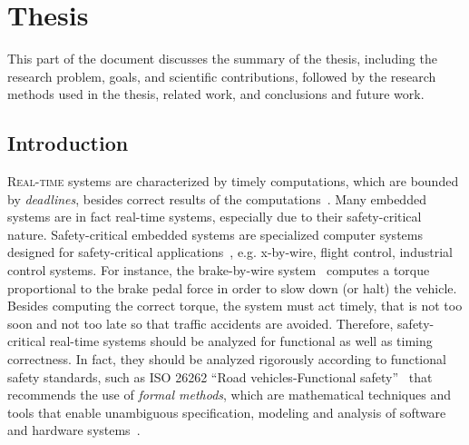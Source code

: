 \part{Thesis}%
This part of the document discusses the summary of the thesis, including the research problem, goals, and scientific contributions, followed by the research methods used in the thesis, related work, and conclusions and future work.

\chapter{Introduction}\label{chapter_introduction}
\lettrine{R}{eal-time} systems are characterized by timely computations, which are bounded by \textit{deadlines}, besides correct results of the computations~\cite{Buttazzo2003}. Many embedded systems are in fact real-time systems, especially due to their safety-critical nature. Safety-critical embedded systems are specialized computer systems designed for safety-critical applications~\cite{WangJiacun2017RES}, e.g. x-by-wire, flight control, industrial control systems. For instance, the brake-by-wire system~\cite{Navet2010DesignSystems} computes a torque proportional to the brake pedal force in order to slow down (or halt) the vehicle. Besides computing the correct torque, the system must act timely, that is not too soon and not too late so that traffic accidents are avoided. Therefore, safety-critical real-time systems should be analyzed for functional as well as timing correctness. In fact, they should be analyzed rigorously according to functional safety standards, such as ISO 26262 ``Road vehicles-Functional safety''~\cite{iso201126262} that recommends the use of \textit{formal methods}, which are mathematical techniques and tools that enable unambiguous specification, modeling and analysis of software and hardware systems~\cite{o2017concise}. 

